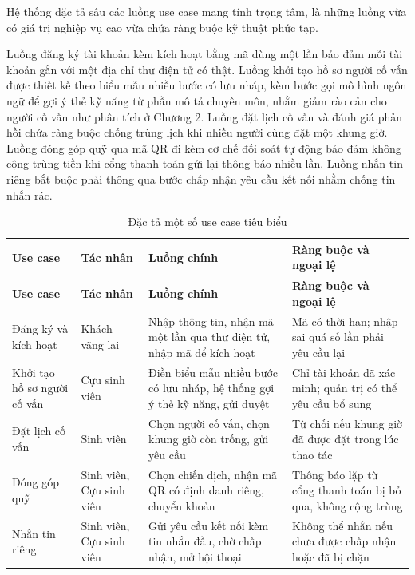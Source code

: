 \documentclass[12pt,a4paper,oneside]{report}
\begin{document}
Hệ thống đặc tả sâu các luồng use case mang tính trọng tâm, là những luồng vừa có giá trị nghiệp vụ cao vừa chứa ràng buộc kỹ thuật phức tạp.

Luồng đăng ký tài khoản kèm kích hoạt bằng mã dùng một lần bảo đảm mỗi tài khoản gắn với một địa chỉ thư điện tử có thật. Luồng khởi tạo hồ sơ người cố vấn được thiết kế theo biểu mẫu nhiều bước có lưu nháp, kèm bước gọi mô hình ngôn ngữ để gợi ý thẻ kỹ năng từ phần mô tả chuyên môn, nhằm giảm rào cản cho người cố vấn như phân tích ở Chương 2. Luồng đặt lịch cố vấn và đánh giá phản hồi chứa ràng buộc chống trùng lịch khi nhiều người cùng đặt một khung giờ. Luồng đóng góp quỹ qua mã QR đi kèm cơ chế đối soát tự động bảo đảm không cộng trùng tiền khi cổng thanh toán gửi lại thông báo nhiều lần. Luồng nhắn tin riêng bắt buộc phải thông qua bước chấp nhận yêu cầu kết nối nhằm chống tin nhắn rác.

\renewcommand{\arraystretch}{1.2}
\begin{longtable}{|>{\raggedright\arraybackslash}p{3.0cm}|>{\raggedright\arraybackslash}p{2.4cm}|>{\raggedright\arraybackslash}p{4.4cm}|>{\raggedright\arraybackslash}p{4.6cm}|}
\caption{Đặc tả một số use case tiêu biểu}\label{tab:usecasespec}\\
\hline \textbf{Use case} & \textbf{Tác nhân} & \textbf{Luồng chính} & \textbf{Ràng buộc và ngoại lệ} \\ \hline
\endfirsthead
\hline \textbf{Use case} & \textbf{Tác nhân} & \textbf{Luồng chính} & \textbf{Ràng buộc và ngoại lệ} \\ \hline
\endhead
Đăng ký và kích hoạt & Khách vãng lai & Nhập thông tin, nhận mã một lần qua thư điện tử, nhập mã để kích hoạt & Mã có thời hạn; nhập sai quá số lần phải yêu cầu lại \\ \hline
Khởi tạo hồ sơ người cố vấn & Cựu sinh viên & Điền biểu mẫu nhiều bước có lưu nháp, hệ thống gợi ý thẻ kỹ năng, gửi duyệt & Chỉ tài khoản đã xác minh; quản trị có thể yêu cầu bổ sung \\ \hline
Đặt lịch cố vấn & Sinh viên & Chọn người cố vấn, chọn khung giờ còn trống, gửi yêu cầu & Từ chối nếu khung giờ đã được đặt trong lúc thao tác \\ \hline
Đóng góp quỹ & Sinh viên, Cựu sinh viên & Chọn chiến dịch, nhận mã QR có định danh riêng, chuyển khoản & Thông báo lặp từ cổng thanh toán bị bỏ qua, không cộng trùng \\ \hline
Nhắn tin riêng & Sinh viên, Cựu sinh viên & Gửi yêu cầu kết nối kèm tin nhắn đầu, chờ chấp nhận, mở hội thoại & Không thể nhắn nếu chưa được chấp nhận hoặc đã bị chặn \\ \hline
\end{longtable}
\renewcommand{\arraystretch}{1}
\end{document}
